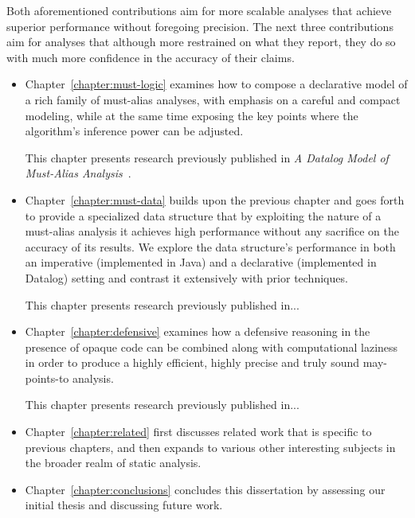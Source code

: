 Both aforementioned contributions aim for more scalable analyses that achieve superior performance without foregoing precision. The next three contributions aim for analyses that although more restrained on what they report, they do so with much more confidence in the accuracy of their claims.

\begin{itemize}[$\bullet$]
\item Chapter~\ref{chapter:must-logic} examines how to compose a declarative model of a rich family of must-alias analyses, with emphasis on a careful and compact modeling, while at the same time exposing the key points where the algorithm's inference power can be adjusted.

This chapter presents research previously published in \emph{A Datalog Model of Must-Alias Analysis}~\cite{soap:2017:Balatsouras}.

\item Chapter~\ref{chapter:must-data} builds upon the previous chapter and goes forth to provide a specialized data structure that by exploiting the nature of a must-alias analysis it achieves high performance without any sacrifice on the accuracy of its results. We explore the data structure's performance in both an imperative (implemented in Java) and a declarative (implemented in Datalog) setting and contrast it extensively with prior techniques.

This chapter presents research previously published in... \todo{}

\item Chapter~\ref{chapter:defensive} examines how a defensive reasoning in the presence of opaque code can be combined along with computational laziness in order to produce a highly efficient, highly precise and truly sound may-points-to analysis.

This chapter presents research previously published in... \todo{}
\end{itemize}

\begin{itemize}[$\bullet$]
\item Chapter~\ref{chapter:related} first discusses related work that is specific to previous chapters, and then expands to various other interesting subjects in the broader realm of static analysis.

\item Chapter~\ref{chapter:conclusions} concludes this dissertation by assessing our initial thesis and discussing future work.
\end{itemize}